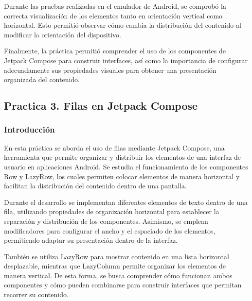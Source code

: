 \documentclass[12pt,a4paper]{article}
\begin{document}
Durante las pruebas realizadas en el emulador de
Android, se comprobó la correcta visualización de
los elementos tanto en orientación vertical como
horizontal. Esto permitió observar cómo cambia la
distribución del contenido al modificar la
orientación del dispositivo.

Finalmente, la práctica permitió comprender el uso
de los componentes de Jetpack Compose para construir
interfaces, así como la importancia de configurar
adecuadamente sus propiedades visuales para obtener
una presentación organizada del contenido.

\subsection{Practica 3. Filas en Jetpack Compose}

\subsubsection{Introducción}
En esta práctica se aborda el uso de filas mediante Jetpack Compose, una herramienta que permite organizar y distribuir los elementos de una interfaz de usuario en aplicaciones Android. Se estudia el funcionamiento de los componentes Row y LazyRow, los cuales permiten colocar elementos de manera horizontal y facilitan la distribución del contenido dentro de una pantalla.

Durante el desarrollo se implementan diferentes elementos de texto dentro de una fila, utilizando propiedades de organización horizontal para establecer la separación y distribución de los componentes. Asimismo, se emplean modificadores para configurar el ancho y el espaciado de los elementos, permitiendo adaptar su presentación dentro de la interfaz.

También se utiliza LazyRow para mostrar contenido en una lista horizontal desplazable, mientras que LazyColumn permite organizar los elementos de manera vertical. De esta forma, se busca comprender cómo funcionan ambos componentes y cómo pueden combinarse para construir interfaces que permitan recorrer su contenido.
\end{document}
